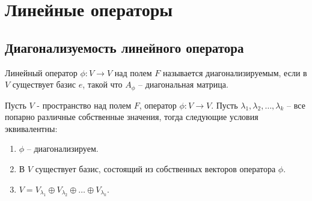 
\section{Линейные операторы}
\subsection{Диагонализуемость линейного оператора}

\begin{definition}
    Линейный оператор $\phi: V \to V$ над полем $F$ называется диагонализируемым, если в $V$ 
    существует базис $e$, такой что $A_{\phi}$ -- диагональная матрица.
\end{definition}

\begin{theorem}
    \label{theorem4.1}
    Пусть $V$ - пространство над полем $F$, оператор $\phi: V \to V$. Пусть $\lambda_1, \lambda_2, \dots, \lambda_k$ -- все 
    попарно различные собственные значения, тогда следующие условия эквивалентны:
    \begin{enumerate}
        \item $\phi$ -- диагонализируем.
        \item В $V$ существует базис, состоящий из собственных векторов оператора $\phi$.
        \item $V = V_{\lambda_1} \oplus V_{\lambda_2} \oplus \dots \oplus V_{\lambda_k}$.
    \end{enumerate}
\end{theorem}

